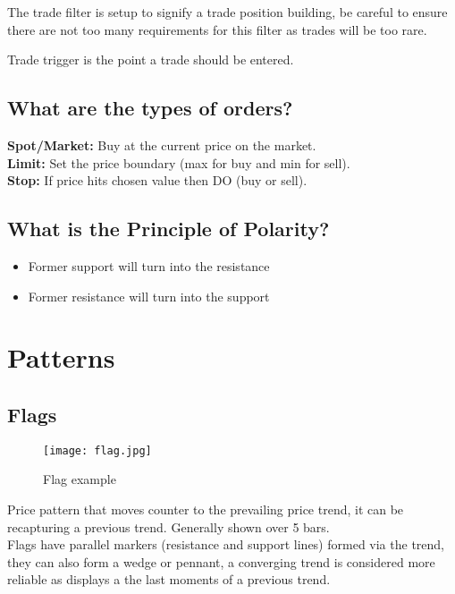 \documentclass[11pt]{scrartcl} %
\begin{document}
The trade filter is setup to signify a trade position building, be careful to ensure there are not 
too many requirements for this filter as trades will be too rare.

Trade trigger is the point a trade should be entered.

\subsection{What are the types of orders?}

\textbf{Spot/Market:} Buy at the current price on the market.\\
\textbf{Limit:} Set the price boundary (max for buy and min for sell).\\
\textbf{Stop:} If price hits chosen value then DO (buy or sell).

\subsection{What is the Principle of Polarity?}

\begin{itemize}
	\item Former support will turn into the resistance
	\item Former resistance will turn into the support
\end{itemize}

\section{Patterns}

\subsection{Flags}

\begin{figure}[h] %
	\centering
	\texttt{[image: flag.jpg]} %
	\caption{Flag example}
\end{figure}

Price pattern that moves counter to the prevailing price trend, it can be recapturing a previous
trend. Generally shown over 5 bars. \\

Flags have parallel markers (resistance and support lines) formed via the trend, they can also
form a wedge or pennant, a converging trend is considered more reliable as displays a the last
moments of a previous trend.\\
\end{document}

